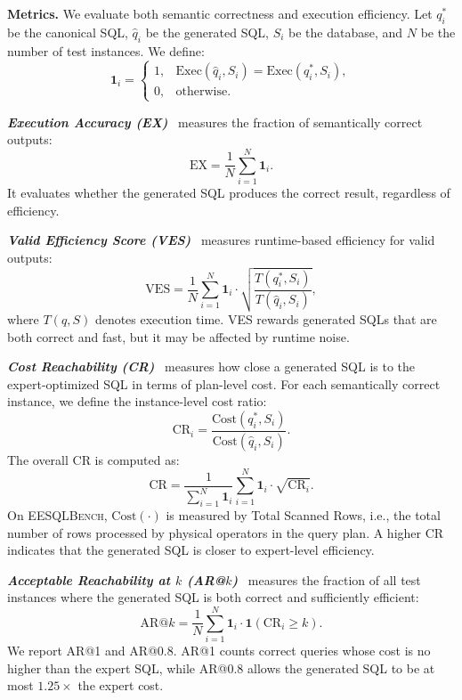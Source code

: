 \textbf{Metrics.}
We evaluate both semantic correctness and execution efficiency.
Let $q_i^*$ be the canonical SQL, $\hat{q}_i$ be the generated SQL, $S_i$ be the database, and $N$ be the number of test instances.
We define:
\[
\mathbf{1}_i =
\begin{cases}
	1, & \mathrm{Exec}(\hat{q}_i,S_i)=\mathrm{Exec}(q_i^*,S_i),\\
	0, & \text{otherwise}.
\end{cases}
\]

\textbf{\textit{Execution Accuracy (EX)}}~\cite{li2023can} measures the fraction of semantically correct outputs:
\[
\mathrm{EX}=\frac{1}{N}\sum_{i=1}^{N}\mathbf{1}_i.
\]
It evaluates whether the generated SQL produces the correct result, regardless of efficiency.

\textbf{\textit{Valid Efficiency Score (VES)}}~\cite{li2023can} measures runtime-based efficiency for valid outputs:
\[
\mathrm{VES}=
\frac{1}{N}\sum_{i=1}^{N}
\mathbf{1}_i
\cdot
\sqrt{\frac{T(q_i^*,S_i)}{T(\hat{q}_i,S_i)}} ,
\]
where $T(q,S)$ denotes execution time.
VES rewards generated SQLs that are both correct and fast, but it may be affected by runtime noise.

\textbf{\textit{Cost Reachability (CR)}}~\cite{lin2026cracking} measures how close a generated SQL is to the expert-optimized SQL in terms of plan-level cost.
For each semantically correct instance, we define the instance-level cost ratio:
\[
\mathrm{CR}_i=
\frac{\mathrm{Cost}(q_i^*,S_i)}
{\mathrm{Cost}(\hat{q}_i,S_i)}.
\]
The overall CR is computed as:
\[
\mathrm{CR}=
\frac{1}{\sum_{i=1}^{N} \mathbf{1}_i}
\sum_{i=1}^{N}
\mathbf{1}_i
\cdot
\sqrt{
	\mathrm{CR}_i
}.
\]
On \textsc{EESQLBench}, $\mathrm{Cost}(\cdot)$ is measured by Total Scanned Rows, i.e., the total number of rows processed by physical operators in the query plan.
A higher CR indicates that the generated SQL is closer to expert-level efficiency.


\textbf{\textit{Acceptable Reachability at $k$ (AR@$k$)}}~\cite{lin2026cracking} measures the fraction of all test instances where the generated SQL is both correct and sufficiently efficient:
\[
\mathrm{AR}@k=
\frac{1}{N}
\sum_{i=1}^{N}
\mathbf{1}_i\cdot \mathbf{1}(\mathrm{CR}_i\ge k).
\]
We report AR@1 and AR@0.8.
AR@1 counts correct queries whose cost is no higher than the expert SQL, while AR@0.8 allows the generated SQL to be at most $1.25\times$ the expert cost.

